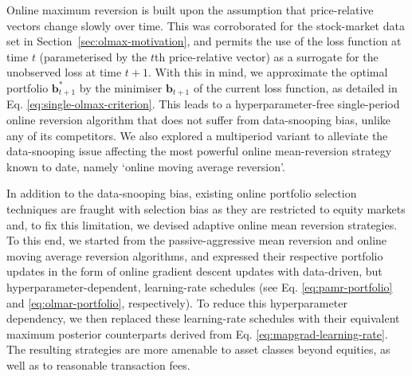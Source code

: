 Online maximum reversion is built upon the assumption that price-relative vectors change slowly over time. This was corroborated for the stock-market data set in Section~\ref{sec:olmax-motivation}, and permits the use of the loss function at time $t$ (parameterised by the $t$th price-relative vector) as a surrogate for the unobserved loss at time $t+1$. With this in mind, we approximate the optimal portfolio $\mathbf{b}_{t+1}^*$ by the minimiser $\mathbf{b}_{t+1}$ of the current loss function, as detailed in Eq. \eqref{eq:single-olmax-criterion}. This leads to a hyperparameter-free single-period online reversion algorithm that does not suffer from data-snooping bias, unlike any of its competitors. We also explored a multiperiod variant to alleviate the data-snooping issue affecting the most powerful online mean-reversion strategy known to date, namely `online moving average reversion'.

In addition to the data-snooping bias, existing online portfolio selection techniques are fraught with selection bias as they are restricted to equity markets and, to fix this limitation, we devised adaptive online mean reversion strategies. To this end, we started from the passive-aggressive mean reversion and online moving average reversion algorithms, and expressed their respective portfolio updates in the form of online gradient descent updates with data-driven, but hyperparameter-dependent, learning-rate schedules (see Eq. \eqref{eq:pamr-portfolio} and \eqref{eq:olmar-portfolio}, respectively). To reduce this hyperparameter dependency, we then replaced these learning-rate schedules with their equivalent maximum posterior counterparts derived from Eq. \eqref{eq:mapgrad-learning-rate}. The resulting strategies are more amenable to asset classes beyond equities, as well as to reasonable transaction fees.